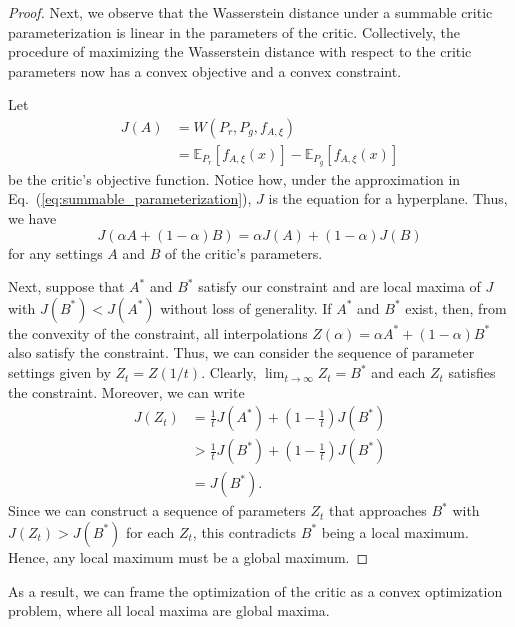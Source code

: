 \documentclass[letterpaper]{article} %
\begin{document}
\begin{proof}
Next, we observe that the Wasserstein distance under a summable critic parameterization is linear in the parameters of the critic. Collectively, the procedure of maximizing the Wasserstein distance with respect to the critic parameters now has a convex objective and a convex constraint.

Let
\begin{equation}
\begin{aligned}
J(A) &= W(P_r, P_g, f_{A, \xi})\\
&= \mathbb{E}_{P_r}\left[f_{A, \xi}(x)\right] - \mathbb{E}_{P_g}\left[f_{A, \xi}(x)\right]
\end{aligned}
\end{equation}
be the critic's objective function. Notice how, under the approximation in Eq.~(\ref{eq:summable_parameterization}), $J$ is the equation for a hyperplane. Thus, we have
\begin{equation*}
J(\alpha A + (1 - \alpha) B) = \alpha J(A) + (1 - \alpha) J(B)
\end{equation*}
for any settings $A$ and $B$ of the critic's parameters.

Next, suppose that $A^*$ and $B^*$ satisfy our constraint and are local maxima of $J$ with $J(B^*) < J(A^*)$ without loss of generality. If $A^*$ and $B^*$ exist, then, from the convexity of the constraint, all interpolations $Z(\alpha) = \alpha A^* + (1-\alpha)B^*$ also satisfy the constraint. Thus, we can consider the sequence of parameter settings given by $Z_t = Z(1/t)$. Clearly, $\lim_{t \to \infty} Z_t = B^*$ and each $Z_t$ satisfies the constraint. Moreover, we can write
\begin{equation*}
\begin{aligned}
J(Z_t) &= \frac{1}{t} J(A^*) + (1 - \frac{1}{t}) J(B^*) \\
&> \frac{1}{t} J(B^*) + (1 - \frac{1}{t}) J(B^*) \\
&= J(B^*).
\end{aligned}
\end{equation*}
Since we can construct a sequence of parameters $Z_t$ that approaches $B^*$ with $J(Z_t) > J(B^*)$ for each $Z_t$, this contradicts $B^*$ being a local maximum. Hence, any local maximum must be a global maximum.
\end{proof}

As a result, we can frame the optimization of the critic as a convex optimization problem, where all local maxima are global maxima.
\end{document}
